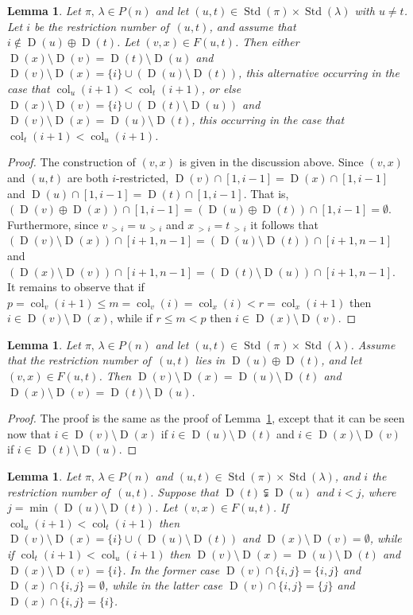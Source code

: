 \documentclass[10pt]{amsart}
\newtheorem{lemm}[theo]{Lemma}
\theoremstyle{definition}
\DeclareMathOperator{\col}{col}
\newcommand{\morethan}[2]{#1\,{_{>\,#2}}}
\DeclareMathOperator{\STD}{Std}
\DeclareMathOperator{\D}{D}
\begin{document}
\begin{lemm}\label{knuthmoveweakorderrelationLem}
Let $\pi,\,\lambda\in P(n)$ and let $(u,t)\in\STD(\pi)\times\STD(\lambda)$
with $u\ne t$. Let $i$ be the restriction
number of~$(u,t)$, and assume that $i\notin \D(u)\oplus\D(t)$.
Let $(v,x)\in F(u,t)$.
Then either
$\D(x)\setminus\D(v)=\D(t)\setminus\D(u)$
and
$\D(v)\setminus\D(x)=\{i\}\cup(\D(u)\setminus\D(t))$,
this alternative occurring in the case that
$\col_u(i+1)<\col_t(i+1)$, or else
$\D(x)\setminus\D(v)=\{i\}\cup(\D(t)\setminus\D(u))$
and
$\D(v)\setminus\D(x)=\D(u)\setminus\D(t)$,
this occurring in the case that
$\col_t(i+1)<\col_u(i+1)$.
\end{lemm}

\begin{proof}
The construction of $(v,x)$ is given in the discussion above. Since
$(v,x)$ and $(u,t)$ are both $i$-restricted,
$\D(v)\cap[1,i-1]=\D(x)\cap[1,i-1]$ and $\D(u)\cap[1,i-1]=\D(t)\cap[1,i-1]$.
That is,
$(\D(v)\oplus \D(x))\cap[1,i-1] = (\D(u)\oplus \D(t))\cap[1,i-1] =\emptyset$.
Furthermore, since $\morethan vi= \morethan ui$ and
$\morethan xi= \morethan ti$ it follows that
$(\D(v)\setminus\D(x))\cap[i+1,n-1]=(\D(u)\setminus\D(t))\cap[i+1,n-1]$ and
$(\D(x)\setminus\D(v))\cap[i+1,n-1]=(\D(t)\setminus\D(u))\cap[i+1,n-1]$.
It remains to observe that if
$p=\col_v(i+1)\leqslant m=\col_v(i)=\col_x(i)<r=\col_x(i+1)$ then
$i\in\D(v)\setminus\D(x)$, while if
$r\leqslant m<p$ then $i\in\D(x)\setminus\D(v)$.
\end{proof}

\begin{lemm}\label{knuthmoveweakorderrelationLemb}
Let $\pi,\,\lambda\in P(n)$ and let $(u,t)\in\STD(\pi)\times\STD(\lambda)$.
Assume that the restriction number of~$(u,t)$ lies in
$\D(u)\oplus\D(t)$, and let $(v,x)\in F(u,t)$.
Then $\D(v)\setminus\D(x)=\D(u)\setminus\D(t)$ and
$\D(x)\setminus\D(v)=\D(t)\setminus\D(u)$.
\end{lemm}

\begin{proof}
The proof is the same as the proof of Lemma~\ref{knuthmoveweakorderrelationLem}, except
that it can be seen now that
$i\in\D(v)\setminus\D(x)$ if $i\in\D(u)\setminus\D(t)$ and
$i\in\D(x)\setminus\D(v)$ if $i\in\D(t)\setminus\D(u)$.
\end{proof}

\begin{lemm}\label{noname2}
Let $\pi,\,\lambda\in P(n)$ and $(u,t)\in\STD(\pi)\times\STD(\lambda)$,
and $i$ the restriction number of~$(u,t)$.
Suppose that $\D(t)\subsetneqq\D(u)$ and $i<j$, where
$j=\min (\D(u)\setminus\D(t))$. Let $(v,x)\in F(u,t)$.
If $\col_u(i+1)<\col_t(i+1)$ then
$\D(v)\setminus\D(x)=\{i\}\cup(\D(u)\setminus\D(t))$ and
$\D(x)\setminus\D(v)=\emptyset$, while if $\col_t(i+1)<\col_u(i+1)$ then
$\D(v)\setminus\D(x)=\D(u)\setminus\D(t)$ and
$\D(x)\setminus\D(v)=\{i\}$. In the former case $\D(v)\cap\{i,j\}=\{i,j\}$ and
$\D(x)\cap\{i,j\}=\emptyset$, while in the latter case $\D(v)\cap\{i,j\}=\{j\}$ and
$\D(x)\cap\{i,j\}=\{i\}$.
\end{lemm}
\end{document}
